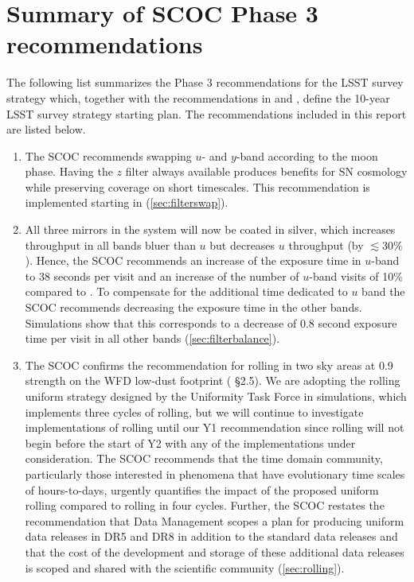 \section{Summary of SCOC Phase 3 recommendations}\label{sec:summary}

The following list summarizes the Phase 3 recommendations for the LSST survey strategy which, together with the recommendations in  and , define the 10-year LSST survey strategy starting plan.   The recommendations included in this report are listed below.

\begin{enumerate}
\renewcommand{\labelenumi}{\roman{enumi}.} 

\item The SCOC recommends swapping $u$- and $y$-band according to the moon phase. Having the $z$ filter always available produces benefits for SN cosmology while preserving coverage on short timescales. This recommendation is implemented starting in  (\autoref{sec:filterswap}).

\item All three mirrors in the system will now be coated in silver, which increases throughput in all bands bluer than $u$ but decreases $u$ throughput (by $\lesssim30\%$). Hence, the SCOC recommends an increase of the exposure time in $u$-band to 38 seconds per visit and an increase of the number of $u$-band visits of 10\% compared to . To compensate for the additional time dedicated to $u$ band the SCOC recommends decreasing the exposure time in the other bands. Simulations show that this corresponds to a decrease of 0.8 second exposure time per visit in all other bands (\autoref{sec:filterbalance}).

\item {The SCOC confirms the recommendation for rolling in two sky areas at 0.9 strength on the WFD low-dust footprint ( \S2.5). We are adopting the rolling uniform strategy designed by the Uniformity Task Force in  simulations, which implements three cycles of rolling, but we will continue to investigate implementations of rolling until our Y1 recommendation since rolling will not begin before the start of Y2 with any of the implementations under consideration.  The SCOC recommends that the time domain community, particularly those interested in phenomena that have evolutionary time scales of hours-to-days, urgently quantifies the impact of the proposed uniform rolling compared to rolling in four cycles. Further, the SCOC restates the recommendation that Data Management scopes a plan for producing uniform data releases in DR5 and DR8 in addition to the standard data releases and that the cost of the development and storage of these additional data releases is scoped and shared with the scientific community (\autoref{sec:rolling}).} 


\end{enumerate}
